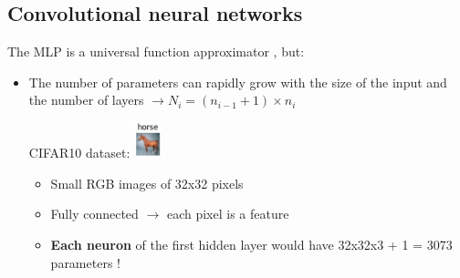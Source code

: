 \documentclass[usenames,dvipsnames]{beamer}
\begin{document}
    \subsection{Convolutional neural networks}
    \begin{frame}{\secname}{\subsecname}
        The MLP is a universal function approximator \cite{cybenko1989approximation}, but:
        \begin{itemize}
            \item The number of parameters can rapidly grow with the size of the input and the number of layers $\rightarrow N_i = (n_{i-1}+1) \times n_i$
            \begin{example}
                CIFAR10 dataset: \includegraphics[width=0.8cm]{figures/DL_fundamentals/CIFAR10-horse.png}\\
                \begin{itemize}
                    \item Small RGB images of 32x32 pixels
                    \item Fully connected $\rightarrow$ each pixel is a feature
                    \item \textbf{Each neuron} of the first hidden layer would have 32x32x3 + 1 = {\color{orange}3073 parameters} !
                \end{itemize}
            \end{example}
        \end{itemize}
    \end{frame}
\end{document}
